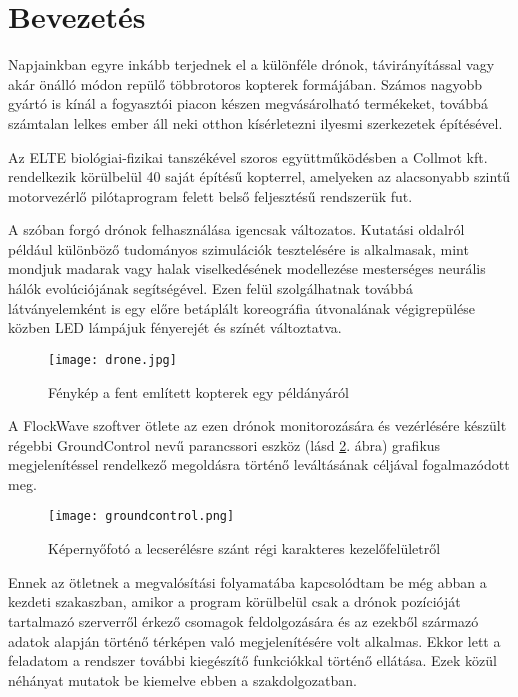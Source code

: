 \section{Bevezetés}

Napjainkban egyre inkább terjednek el a különféle drónok, távirányítással vagy
akár önálló módon repülő többrotoros kopterek formájában. Számos nagyobb gyártó is
kínál a fogyasztói piacon készen megvásárolható termékeket, továbbá számtalan
lelkes ember áll neki otthon kísérletezni ilyesmi szerkezetek építésével.

Az ELTE biológiai-fizikai tanszékével szoros együttműködésben a Collmot kft.
rendelkezik körülbelül 40 saját építésű kopterrel, amelyeken az alacsonyabb szintű
motorvezérlő pilótaprogram felett belső feljesztésű rendszerük fut.

A szóban forgó drónok felhasználása igencsak változatos. Kutatási oldalról
például különböző tudományos szimulációk tesztelésére is alkalmasak, mint
mondjuk madarak vagy halak viselkedésének modellezése mesterséges neurális
hálók evolúciójának segítségével. Ezen felül szolgálhatnak továbbá
látványelemként is egy előre betáplált koreográfia útvonalának végigrepülése
közben LED lámpájuk fényerejét és színét változtatva.

\begin{figure}[h!]
  \center
  \texttt{[image: drone.jpg]}
  \caption{Fénykép a fent említett kopterek egy példányáról}
  \label{fig:drone}
\end{figure}

A FlockWave szoftver ötlete az ezen drónok monitorozására és vezérlésére készült
régebbi GroundControl nevű parancssori eszköz (lásd \ref{fig:groundcontrol}.
ábra) grafikus megjelenítéssel rendelkező megoldásra történő leváltásának
céljával fogalmazódott meg.


\begin{figure}[H]
  \texttt{[image: groundcontrol.png]}
  \caption{Képernyőfotó a lecserélésre szánt régi karakteres kezelőfelületről}
  \label{fig:groundcontrol}
\end{figure}

\noindent Ennek az ötletnek a megvalósítási folyamatába
kapcsolódtam be még abban a kezdeti szakaszban, amikor a program körülbelül csak
a drónok pozícióját tartalmazó szerverről érkező csomagok feldolgozására és az
ezekből származó adatok alapján történő térképen való megjelenítésére volt
alkalmas. Ekkor lett a feladatom a rendszer további kiegészítő funkciókkal
történő ellátása. Ezek közül néhányat mutatok be kiemelve ebben a
szakdolgozatban.
